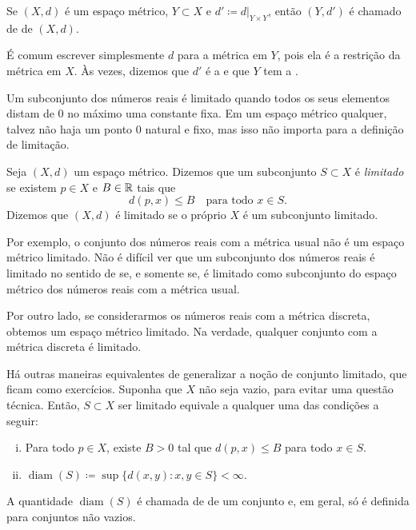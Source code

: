 \begin{defn}
Se $(X,d)$ é um espaço métrico, $Y \subset X$ e $d' \coloneqq d|_{Y \times Y}$,
então $(Y,d')$ é chamado de \emph{} de $(X,d)$.
\end{defn}

É comum escrever simplesmente $d$ para a métrica em $Y$, pois ela é a
restrição da métrica em $X$. Às vezes, dizemos que $d'$ é a
\emph{} e que $Y$ tem a
\emph{}.

\medskip

Um subconjunto dos números reais é limitado quando todos os seus elementos
distam de 0 no máximo uma constante fixa.
Em um espaço métrico qualquer, talvez não haja um ponto 0 natural e fixo,
mas isso não importa para a definição de limitação.

\begin{defn}
Seja $(X,d)$ um espaço métrico. Dizemos que um subconjunto $S \subset X$ é
\emph{limitado} se existem $p \in X$ e $B \in {\mathbb{R}}$
tais que
\begin{equation*}
d(p,x) \leq B \quad \text{para todo } x \in S.
\end{equation*}
Dizemos que $(X,d)$ é limitado se o próprio $X$ é um subconjunto limitado.
\end{defn}

Por exemplo, o conjunto dos números reais com a métrica usual não é um
espaço métrico limitado. Não é difícil ver que um subconjunto dos números
reais é limitado no sentido de  se, e somente se,
é limitado como subconjunto do espaço métrico dos números reais com a métrica
usual.

Por outro lado, se considerarmos os números reais com a métrica discreta,
obtemos um espaço métrico limitado. Na verdade, qualquer conjunto com a
métrica discreta é limitado.

Há outras maneiras equivalentes de generalizar a noção de conjunto limitado,
que ficam como exercícios. Suponha que $X$ não seja vazio, para evitar uma
questão técnica. Então, $S \subset X$ ser limitado equivale a qualquer uma
das condições a seguir:
\begin{enumerate}[(i)]
\item
Para todo $p \in X$, existe $B > 0$ tal que $d(p,x) \leq B$ para todo $x \in S$.
\item
{}%
$\operatorname{diam}(S) \coloneqq \sup \bigl\{ d(x,y) : x,y \in S \bigr\} < \infty$.
\end{enumerate}
A quantidade $\operatorname{diam}(S)$ é chamada de
\emph{} de um conjunto e, em geral, só é definida para
conjuntos não vazios.


